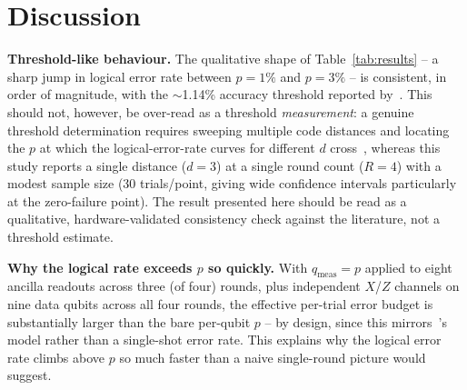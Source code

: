 \documentclass[pdflatex,sn-mathphys,Numbered]{sn-jnl}
\begin{document}
\section{Discussion}\label{sec:discussion}

\textbf{Threshold-like behaviour.} The qualitative shape of Table~\ref{tab:results} -- a sharp jump in logical error rate between $p=1\%$ and $p=3\%$ -- is consistent, in order of magnitude, with the $\sim$1.14\% accuracy threshold reported by~\cite{dennis2002}. This should not, however, be over-read as a threshold \emph{measurement}: a genuine threshold determination requires sweeping multiple code distances and locating the $p$ at which the logical-error-rate curves for different $d$ cross~\cite{fowler2012,acharya2023}, whereas this study reports a single distance ($d=3$) at a single round count ($R=4$) with a modest sample size (30 trials/point, giving wide confidence intervals particularly at the zero-failure point). The result presented here should be read as a qualitative, hardware-validated consistency check against the literature, not a threshold estimate.

\textbf{Why the logical rate exceeds $p$ so quickly.} With $q_{\mathrm{meas}}=p$ applied to eight ancilla readouts across three (of four) rounds, plus independent $X$/$Z$ channels on nine data qubits across all four rounds, the effective per-trial error budget is substantially larger than the bare per-qubit $p$ -- by design, since this mirrors~\cite{dennis2002}'s model rather than a single-shot error rate. This explains why the logical error rate climbs above $p$ so much faster than a naive single-round picture would suggest.
\end{document}
